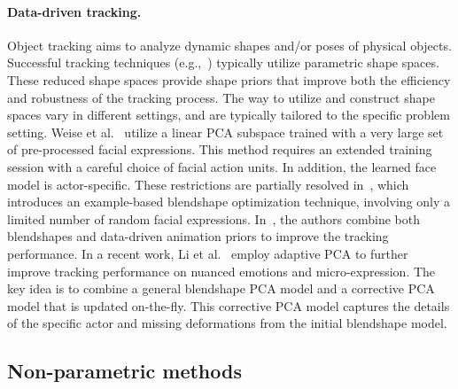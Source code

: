 \paragraph*{Data-driven tracking.} Object tracking aims to analyze dynamic shapes and/or poses of physical objects. Successful tracking techniques (e.g.,~\cite{Weise:2009:FLF,Weise:2011:RPF,Li:2013:RFA,Cao:2013:SRR,Cao:2014:DDE}) typically utilize parametric shape spaces. These reduced shape spaces provide shape priors that improve both the efficiency and robustness of the tracking process. The way to utilize and construct shape spaces vary in different settings, and are typically tailored to the specific problem setting. Weise et al.~\cite{Weise:2009:FLF} utilize a linear PCA subspace trained with a very large set of pre-processed facial expressions. This method requires an extended training session with a careful choice of facial action units. In addition, the learned face model is actor-specific. These restrictions are partially resolved in~\cite{Li:2010:EFR}, which introduces an example-based blendshape optimization technique, involving only a limited number of random facial expressions.
In~\cite{Weise:2011:RPF}, the authors combine both blendshapes and data-driven animation priors to improve the tracking performance. In a recent work, Li et al.~\cite{Li:2013:RFA} employ adaptive PCA to further improve tracking performance on nuanced emotions and micro-expression. The key idea is to combine a general blendshape PCA model and a corrective PCA model that is updated on-the-fly. This corrective PCA model captures the details of the specific actor and missing deformations from the initial blendshape model.

\vspace{-.2cm}

\subsection{Non-parametric methods}


